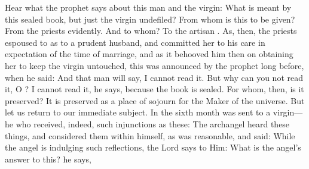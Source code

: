  Hear what the prophet says about this man and the virgin:  What is meant by this sealed book, but just the virgin undefiled? From whom is this to be given? From the priests evidently. And to whom? To the artisan . As, then, the priests espoused  to  as to a prudent husband, and committed her to his care in expectation of the time of marriage, and as it behooved him then on obtaining her to keep the virgin untouched, this was announced by the prophet long before, when he said:  And that man will say, I cannot read it. But why can you not read it, O ? I cannot read it, he says, because the book is sealed. For whom, then, is it preserved? It is preserved as a place of sojourn for the Maker of the universe. But let us return to our immediate subject. In the sixth month  was sent to a virgin—he who received, indeed, such injunctions as these:  The archangel heard these things, and considered them within himself, as was reasonable, and said:  While the angel is indulging such reflections, the Lord says to Him:  What is the angel's answer to this?  he says, 
